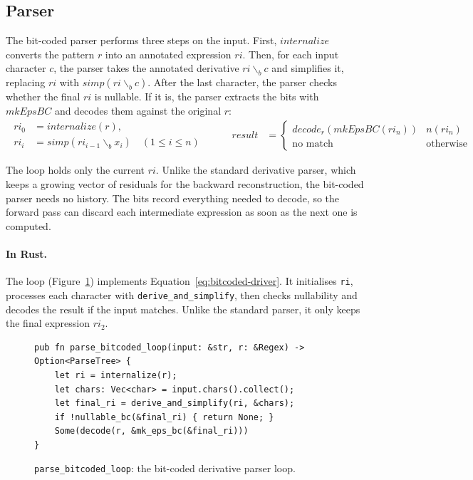 %
%
%

\subsection{Parser}
\label{sec:deriv-bc-driver}

The bit-coded parser performs three steps on the input. 
First, $\mathit{internalize}$ converts the pattern $r$ 
into an annotated expression $\mathit{ri}$. 
Then, for each input character $c$, 
the parser takes the annotated derivative $\mathit{ri} \backslash_b c$ 
and simplifies it, 
replacing $\mathit{ri}$ with $\mathit{simp}(\mathit{ri} \backslash_b c)$.
After the last character, 
the parser checks whether the final $\mathit{ri}$ is nullable. 
If it is, the parser extracts the bits with $\mathit{mkEpsBC}$ 
and decodes them against the original $r$:
\begin{equation}\label{eq:bitcoded-driver}
\begin{alignedat}{2}
\begin{aligned}
\mathit{ri}_0 &= \mathit{internalize}(r), \\
\mathit{ri}_i &= \mathit{simp}(\mathit{ri}_{i-1} \backslash_b x_i)
  \quad (1 \leq i \leq n)
\end{aligned}
&\qquad
\mathit{result} &=
  \begin{cases}
    \mathit{decode}_r(\mathit{mkEpsBC}(\mathit{ri}_n))
      & n(\mathit{ri}_n) \\
    \text{no match} & \text{otherwise}
  \end{cases}
\end{alignedat}
\end{equation}

The loop holds only the current $\mathit{ri}$. 
Unlike the standard derivative parser, 
which keeps a growing vector of residuals for the backward reconstruction, 
the bit-coded parser needs no history. 
The bits record everything needed to decode, 
so the forward pass can discard each intermediate expression 
as soon as the next one is computed.

%


\paragraph{In Rust.}
The loop (Figure~\ref{fig:deriv-bc-loop-rust})
implements Equation~\eqref{eq:bitcoded-driver}.
It initialises \texttt{ri}, processes each character with
\texttt{derive\_and\_simplify}, then checks nullability
and decodes the result if the input matches.
Unlike the standard parser, it only keeps the final expression $\mathit{ri}_2$.
\begin{figure}[H]
\small
\begin{verbatim}
pub fn parse_bitcoded_loop(input: &str, r: &Regex) -> Option<ParseTree> {
    let ri = internalize(r);
    let chars: Vec<char> = input.chars().collect();
    let final_ri = derive_and_simplify(ri, &chars);
    if !nullable_bc(&final_ri) { return None; }
    Some(decode(r, &mk_eps_bc(&final_ri)))
}
\end{verbatim}
\caption{\texttt{parse\_bitcoded\_loop}: 
the bit-coded derivative parser loop.}
\label{fig:deriv-bc-loop-rust}
\end{figure}

